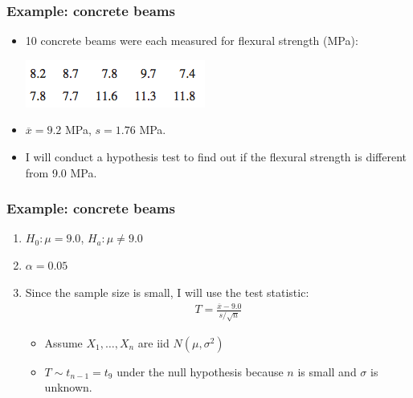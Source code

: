 \documentclass[handout]{beamer}\usepackage[]{graphicx}\usepackage[]{color}
\providecommand{\ov}[1]{\overline{#1}}
\numberwithin{equation}{section}
\begin{document}
\begin{frame}
\frametitle{Example: concrete beams}
\begin{itemize}
\item 10 concrete beams were each measured for flexural strength (MPa):
\pause \begin{center}
 \includegraphics{../../fig/fbeams.png}
\end{center}
\pause \item $\ov{x} = 9.2$ MPa, $s = 1.76$ MPa.
\pause \item I will conduct a hypothesis test to find out if the flexural strength is different from 9.0 MPa.
\end{itemize}
\end{frame}


\begin{frame}
\frametitle{Example: concrete beams}
\begin{enumerate}[1. ]
\item  $H_0: \mu = 9.0$, $H_a: \mu \ne 9.0$
\pause \item $\alpha = 0.05$
\pause \item Since the sample size is small, I will use the test statistic:
\begin{align*}
T = \frac{\ov{x} - 9.0}{s/\sqrt{n}}
\end{align*}
\begin{itemize}
\pause \item Assume $X_1, \ldots, X_n$ are iid $N(\mu, \sigma^2)$
\pause \item $T \sim t_{n - 1} = t_{9}$ under the null hypothesis because $n$ is small and $\sigma$ is unknown.
\end{itemize}
\end{enumerate}
\end{frame}
\end{document}
